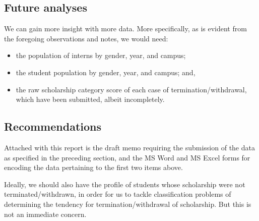 \documentclass[a4paper]{article}
\providecommand{\tightlist}{%
  \setlength{\itemsep}{0pt}\setlength{\parskip}{0pt}}
\begin{document}
\hypertarget{future-analyses}{%
\subsection{Future analyses}\label{future-analyses}}

We can gain more insight with more data. More specifically, as is
evident from the foregoing observations and notes, we would need:

\begin{itemize}
\tightlist
\item
  the population of interns by gender, year, and campus;
\item
  the student population by gender, year, and campus; and,
\item
  the raw scholarship category score of each case of
  termination/withdrawal, which have been submitted, albeit
  incompletely.
\end{itemize}

\hypertarget{recommendations}{%
\subsection{Recommendations}\label{recommendations}}

Attached with this report is the draft memo requiring the submission of
the data as specified in the preceding section, and the MS Word and MS
Excel forms for encoding the data pertaining to the first two items
above.

Ideally, we should also have the profile of students whose scholarship
were not terminated/withdrawn, in order for us to tackle classification
problems of determining the tendency for termination/withdrawal of
scholarship. But this is not an immediate concern.
\end{document}
